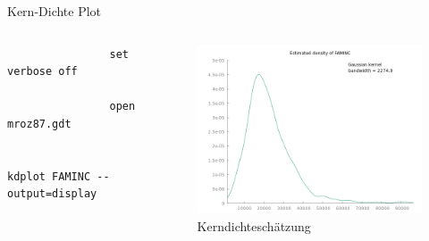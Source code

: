 \documentclass{beamer}[11pt]
\begin{document}
\begin{frame}[fragile]{Kern-Dichte Plot}
	\begin{columns}[T] %
		\scriptsize
		\begin{column}{.45\textwidth}
			\begin{verbatim}
				set verbose off

				open mroz87.gdt

				kdplot FAMINC --output=display
			\end{verbatim}
		\end{column}

		\begin{column}{.55\textwidth}
			\begin{figure}
				\includegraphics[width=1.0\textwidth]{../figures/kdplot.png}
				\caption{Kerndichteschätzung}
			\end{figure}
	  \end{column}
	\end{columns}
\end{frame}
\end{document}
